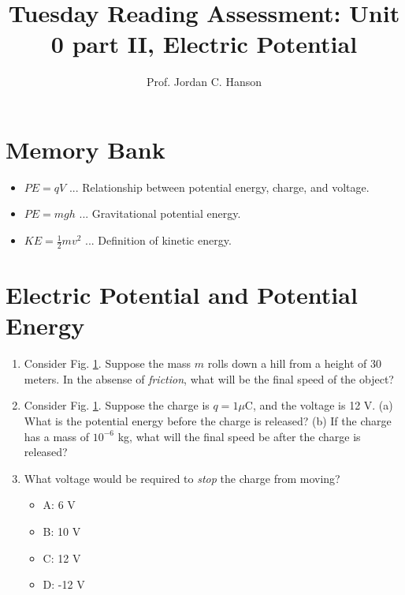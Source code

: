\documentclass{article}
\begin{document}
\title{Tuesday Reading Assessment: Unit 0 part II, Electric Potential}
\author{Prof. Jordan C. Hanson}

\maketitle

\section{Memory Bank}

\begin{itemize}
\item $PE = q V$ ... Relationship between potential energy, charge, and voltage.
\item $PE = m g h$ ... Gravitational potential energy.
\item $KE = \frac{1}{2}m v^2$ ... Definition of kinetic energy.
\end{itemize}

\section{Electric Potential and Potential Energy}

\begin{enumerate}
\begin{figure}[ht]
\centering
\texttt{[image: hill.png]}
\caption{\label{fig:hill} The relationship between potential energy and voltage.}
\end{figure}
\item Consider Fig. \ref{fig:hill}.  Suppose the mass $m$ rolls down a hill from a height of 30 meters.  In the absense of \textit{friction}, what will be the final speed of the object? \\ \vspace{1cm}
\item Consider Fig. \ref{fig:hill}.  Suppose the charge is $q = 1 \mu$C, and the voltage is 12 V.  (a) What is the potential energy before the charge is released? (b) If the charge has a mass of $10^{-6}$ kg, what will the final speed be after the charge is released? \\ \vspace{1.5cm}
\item What voltage would be required to \textit{stop} the charge from moving?
\begin{itemize}
\item A: 6 V
\item B: 10 V
\item C: 12 V
\item D: -12 V
\end{itemize}
\end{enumerate}
\end{document}
